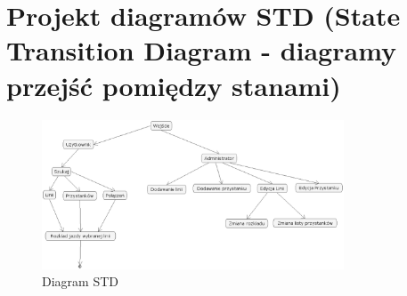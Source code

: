 \section{Projekt diagramów STD (State Transition Diagram - diagramy przejść pomiędzy
stanami)}

\begin{figure}[!htp]
  \centering
  \includegraphics[width=0.8\textwidth]{./img/state.eps}
  \caption{Diagram STD}
  \label{fig:scr3}
\end{figure}
